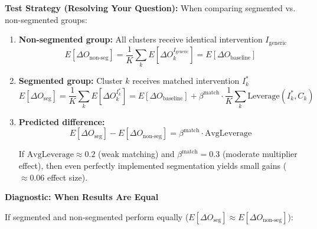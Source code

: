 \begin{tcolorbox}[colback=blue!5!white, colframe=blue!75!black,
    title=Axiom SEG-MATCH-9: Specificity-Matching Principle]
\textbf{Test Strategy (Resolving Your Question):}
When comparing segmented vs. non-segmented groups:

\begin{enumerate}
\item \textbf{Non-segmented group:} All clusters receive identical intervention $I_{\text{generic}}$
  \begin{equation}
  E[\Delta O_{\text{non-seg}}] = \frac{1}{K} \sum_k E[\Delta O_k^{I_{\text{generic}}}] = E[\Delta O_{\text{baseline}}]
  \end{equation}

\item \textbf{Segmented group:} Cluster $k$ receives matched intervention $I_k^*$
  \begin{equation}
  E[\Delta O_{\text{seg}}] = \frac{1}{K} \sum_k E[\Delta O_k^{I_k^*}] = E[\Delta O_{\text{baseline}}] + \beta^{\text{match}} \cdot \frac{1}{K}\sum_k \text{Leverage}(I_k^*, C_k)
  \end{equation}

\item \textbf{Predicted difference:}
  \begin{equation}
  E[\Delta O_{\text{seg}}] - E[\Delta O_{\text{non-seg}}] = \beta^{\text{match}} \cdot \text{AvgLeverage}
  \end{equation}

If $\text{AvgLeverage} \approx 0.2$ (weak matching) and $\beta^{\text{match}} = 0.3$ (moderate multiplier effect),
then even perfectly implemented segmentation yields small gains ($\approx 0.06$ effect size).

\end{enumerate}

\textbf{Diagnostic: When Results Are Equal}

If segmented and non-segmented perform equally ($E[\Delta O_{\text{seg}}] \approx E[\Delta O_{\text{non-seg}}]$):


\end{tcolorbox}
